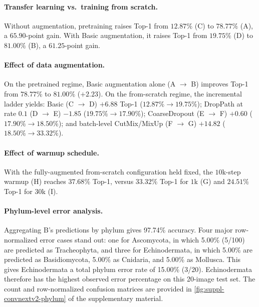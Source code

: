 \paragraph{Transfer learning vs.\ training from scratch.}
Without augmentation, pretraining raises Top-1 from $12.87\%$ (C) to $78.77\%$ (A), a $65.90$-point gain. With Basic augmentation, it raises Top-1 from $19.75\%$ (D) to $81.00\%$ (B), a $61.25$-point gain.

\paragraph{Effect of data augmentation.}
On the pretrained regime, Basic augmentation alone (A $\to$ B) improves Top-1 from $78.77\%$ to $81.00\%$ ($+2.23$). On the from-scratch regime, the incremental ladder yields: Basic (C $\to$ D) $+6.88$ Top-1 ($12.87\% \to 19.75\%$); DropPath at rate $0.1$ (D $\to$ E) $-1.85$ ($19.75\% \to 17.90\%$); CoarseDropout (E $\to$ F) $+0.60$ ($17.90\% \to 18.50\%$); and batch-level CutMix/MixUp (F $\to$ G) $+14.82$ ($18.50\% \to 33.32\%$).

\paragraph{Effect of warmup schedule.}
With the fully-augmented from-scratch configuration held fixed, the $10$k-step warmup (H) reaches $37.68\%$ Top-1, versus $33.32\%$ Top-1 for $1$k (G) and $24.51\%$ Top-1 for $30$k (I).

\paragraph{Phylum-level error analysis.}
Aggregating B's predictions by phylum gives 97.74\% accuracy. Four major row-normalized error cases stand out: one for Ascomycota, in which 5.00\% (5/100) are predicted as Tracheophyta, and three for Echinodermata, in which 5.00\% are predicted as Basidiomycota, 5.00\% as Cnidaria, and 5.00\% as Mollusca. This gives Echinodermata a total phylum error rate of 15.00\% (3/20). Echinodermata therefore has the highest observed error percentage on this 20-image test set. The count and row-normalized confusion matrices are provided in \cref{fig:suppl-convnextv2-phylum} of the supplementary material.

